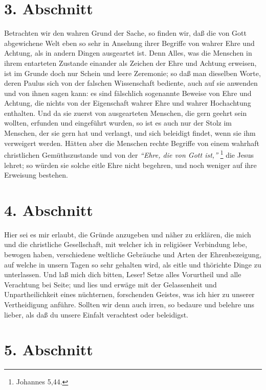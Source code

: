 \section{3. Abschnitt} \label{kap9_ab3}

Betrachten wir den wahren Grund der Sache, so finden wir, daß die von Gott
abgewichene Welt eben so sehr in Ansehung ihrer Begriffe von wahrer Ehre und
Achtung, als in andern Dingen ausgeartet ist. Denn Alles, was die Menschen in
ihrem entarteten Zustande einander als Zeichen der Ehre und Achtung erweisen,
ist im Grunde doch nur Schein und leere Zeremonie; so daß man dieselben Worte,
deren Paulus sich von der falschen
Wissenschaft bediente, auch auf sie
anwenden und von ihnen sagen kann: es sind fälschlich sogenannte Beweise von
Ehre und Achtung, die nichts von der Eigenschaft wahrer Ehre und wahrer
Hochachtung enthalten. Und da sie zuerst von ausgearteten Menschen, die gern
geehrt sein wollten, erfunden und eingeführt wurden, so ist es auch nur der
Stolz im Menschen, der sie gern hat und verlangt, und sich beleidigt findet,
wenn sie ihm verweigert werden. Hätten aber die Menschen rechte Begriffe von
einem wahrhaft christlichen Gemüthszustande und von der
\textit{"`Ehre, die von Gott ist,"'}
\footnote{Johannes 5,44.}
die Jesus lehret; so würden sie solche eitle
Ehre nicht begehren, und noch weniger auf ihre Erweisung bestehen.

\section{4. Abschnitt} \label{kap9_ab4}

Hier sei es mir erlaubt, die Gründe anzugeben und näher zu erklären, die mich
und die christliche Gesellschaft, mit welcher ich in religiöser Verbindung lebe,
bewogen haben, verschiedene weltliche Gebräuche und Arten der Ehrenbezeigung,
auf welche in unsern Tagen so sehr gehalten wird, als eitle und thörichte Dinge
zu unterlassen. Und laß mich dich bitten, Leser! Setze alles Vorurtheil und alle
Verachtung bei Seite; und lies und erwäge mit der Gelassenheit und
Unpartheilichkeit eines nüchternen, forschenden Geistes, was ich hier zu unserer
Vertheidigung anführe. Sollten wir denn auch irren, so bedaure und belehre uns
lieber, als daß du unsere Einfalt verachtest oder beleidigst.

\section{5. Abschnitt} \label{kap9_ab5}


